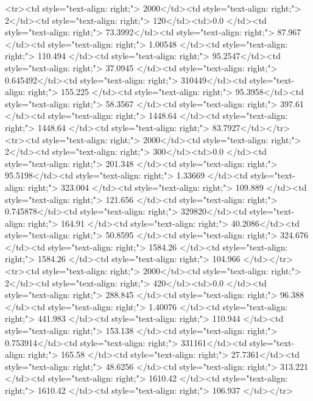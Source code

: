 <tr><td style="text-align: right;">      2000</td><td style="text-align: right;">         2</td><td style="text-align: right;">           120</td><td>0.0          </td><td style="text-align: right;">                73.3992</td><td style="text-align: right;">            87.967 </td><td style="text-align: right;">         1.00548 </td><td style="text-align: right;">        110.494 </td><td style="text-align: right;">            95.2547</td><td style="text-align: right;">              37.0945  </td><td style="text-align: right;">             0.645492</td><td style="text-align: right;">              310449</td><td style="text-align: right;">                      155.225 </td><td style="text-align: right;">            95.3958</td><td style="text-align: right;">                58.3567 </td><td style="text-align: right;">       397.61  </td><td style="text-align: right;">   1448.64 </td><td style="text-align: right;">      1448.64 </td><td style="text-align: right;">                 83.7927</td></tr>
<tr><td style="text-align: right;">      2000</td><td style="text-align: right;">         2</td><td style="text-align: right;">           300</td><td>0.0          </td><td style="text-align: right;">               201.348 </td><td style="text-align: right;">            95.5198</td><td style="text-align: right;">         1.33669 </td><td style="text-align: right;">        323.004 </td><td style="text-align: right;">           109.889 </td><td style="text-align: right;">             121.656   </td><td style="text-align: right;">             0.745878</td><td style="text-align: right;">              329820</td><td style="text-align: right;">                      164.91  </td><td style="text-align: right;">            40.2086</td><td style="text-align: right;">                50.8595 </td><td style="text-align: right;">       324.676 </td><td style="text-align: right;">   1584.26 </td><td style="text-align: right;">      1584.26 </td><td style="text-align: right;">                104.966 </td></tr>
<tr><td style="text-align: right;">      2000</td><td style="text-align: right;">         2</td><td style="text-align: right;">           420</td><td>0.0          </td><td style="text-align: right;">               288.845 </td><td style="text-align: right;">            96.388 </td><td style="text-align: right;">         1.40076 </td><td style="text-align: right;">        441.983 </td><td style="text-align: right;">           110.944 </td><td style="text-align: right;">             153.138   </td><td style="text-align: right;">             0.753914</td><td style="text-align: right;">              331161</td><td style="text-align: right;">                      165.58  </td><td style="text-align: right;">            27.7361</td><td style="text-align: right;">                48.6256 </td><td style="text-align: right;">       313.221 </td><td style="text-align: right;">   1610.42 </td><td style="text-align: right;">      1610.42 </td><td style="text-align: right;">                106.937 </td></tr>
